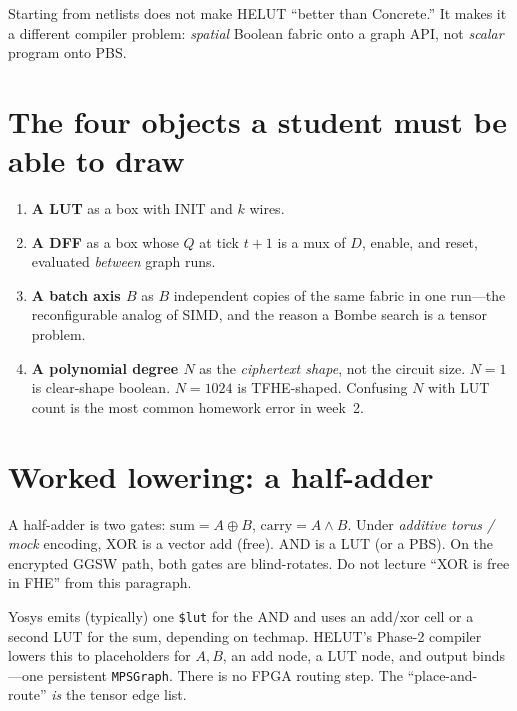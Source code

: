 \begin{remark}
Starting from netlists does not make HELUT ``better than Concrete.''
It makes it a different compiler problem: \emph{spatial} Boolean fabric
onto a graph API, not \emph{scalar} program onto PBS.
\end{remark}

\section{The four objects a student must be able to draw}

\begin{enumerate}
  \item \textbf{A LUT} as a box with INIT and $k$ wires.
  \item \textbf{A DFF} as a box whose $Q$ at tick $t+1$ is a mux of $D$, enable,
        and reset, evaluated \emph{between} graph runs.
  \item \textbf{A batch axis $B$} as $B$ independent copies of the same fabric
        in one run---the reconfigurable analog of SIMD, and the reason a
        Bombe search is a tensor problem.
  \item \textbf{A polynomial degree $N$} as the \emph{ciphertext shape}, not
        the circuit size. $N=1$ is clear-shape boolean. $N=1024$ is
        TFHE-shaped. Confusing $N$ with LUT count is the most common
        homework error in week~2.
\end{enumerate}

\section{Worked lowering: a half-adder}

A half-adder is two gates: $\mathrm{sum}=A\oplus B$, $\mathrm{carry}=A\land B$.
Under \emph{additive torus / mock} encoding, XOR is a vector add (free).
AND is a LUT (or a PBS).
On the encrypted GGSW path, both gates are blind-rotates. Do not lecture
``XOR is free in FHE'' from this paragraph.

\begin{example}
Yosys emits (typically) one \texttt{\$lut} for the AND and uses an add/xor
cell or a second LUT for the sum, depending on techmap.
HELUT's Phase-2 compiler~\cite{helut-paper} lowers this to placeholders for
$A,B$, an add node, a LUT node, and output binds---one persistent
\texttt{MPSGraph}.
There is no FPGA routing step. The ``place-and-route'' \emph{is} the tensor
edge list.
\end{example}

